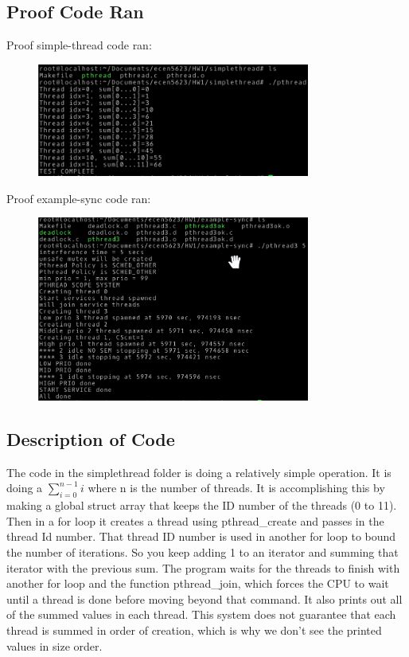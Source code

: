 \documentclass{article}
\begin{document}
\subsection*{Proof Code Ran}
Proof simple-thread code ran:
\begin{figure}[H]
    \centering
    \includegraphics[width=0.8\textwidth]{HW1_P4_1.png}
\end{figure}
Proof example-sync code ran:
\begin{figure}[H]
    \centering
    \includegraphics[width=0.8\textwidth]{HW1_P4_2.png}
\end{figure}
\subsection*{Description of Code}
The code in the simplethread folder is doing a relatively simple operation. It is doing a $\sum_{i=0}^{n-1}i$ where n is the number of threads. It is accomplishing this by making a global struct array that keeps the ID number of the threads (0 to 11). Then in a for loop it creates a thread using pthread\_create and passes in the thread Id number. That thread ID number is used in another for loop to bound the number of iterations. So you keep adding 1 to an iterator and summing that iterator
with the previous sum. The program waits for the threads to finish with another for loop and the function pthread\_join, which forces the CPU to wait until a thread is done before moving beyond that command. It also prints out all of the summed values in each thread. This system does not guarantee that each thread is summed in order of creation, which is why we don't see the printed values in size order.\\
\end{document}
